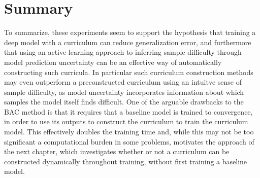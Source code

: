 \section{Summary}
To summarize, these experiments seem to support the hypothesis that training a deep model with a curriculum can reduce generalization error, and furthermore that using an active learning approach to inferring sample difficulty through model prediction uncertainty can be an effective way of automatically constructing such curricula. In particular such curriculum construction methods may even outperform a preconstructed curriculum using an intuitve sense of sample difficulty, as model uncertainty incorporates information about which samples the model itself finds difficult. One of the arguable drawbacks to the BAC method is that it requires that a baseline model is trained to convergence, in order to use its outputs to construct the curriculum to train the curriculum model. This effectively doubles the training time and, while this may not be too significant a computational burden in some problems, motivates the approach of the next chapter, which investigates whether or not a curriculum can be constructed dynamically throughout training, without first training a baseline model.



